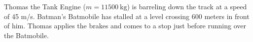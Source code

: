 \documentclass[10pt]{exam}
\begin{document}
\begin{questions}
\begin{parts}
  \end{parts}
  
\question
  Thomas the Tank Engine ($m = \SI{11500}{\kilo\gram}$) is barreling down the track at a speed of 45 m/s.  Batman's Batmobile has stalled at a level crossing 600 meters in front of him.  Thomas applies the brakes and comes to a stop just before running over the Batmobile.

  

\end{questions}
\end{document}
